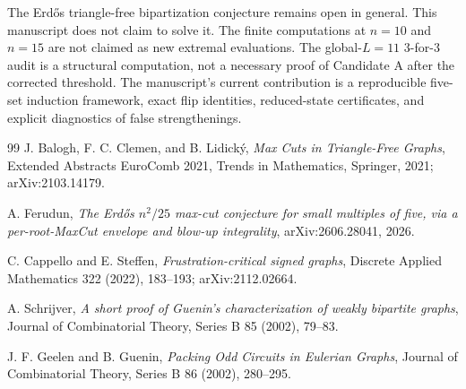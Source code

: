 \documentclass[11pt]{article}
\begin{document}
The Erd\H{o}s triangle-free bipartization conjecture remains open in
general.  This manuscript does not claim to solve it.  The finite
computations at $n=10$ and $n=15$ are not claimed as new extremal
evaluations.  The global-$L=11$ 3-for-3 audit is a structural computation,
not a necessary proof of Candidate A after the corrected threshold.
The manuscript's current contribution is a reproducible five-set induction
framework, exact flip identities, reduced-state certificates, and explicit
diagnostics of false strengthenings.

\begin{thebibliography}{99}
J. Balogh, F. C. Clemen, and B. Lidick\'y,
\emph{Max Cuts in Triangle-Free Graphs},
Extended Abstracts EuroComb 2021, Trends in Mathematics, Springer, 2021;
arXiv:2103.14179.

A. Ferudun,
\emph{The Erd\H{o}s $n^2/25$ max-cut conjecture for small multiples of five,
via a per-root-MaxCut envelope and blow-up integrality},
arXiv:2606.28041, 2026.

C. Cappello and E. Steffen,
\emph{Frustration-critical signed graphs},
Discrete Applied Mathematics 322 (2022), 183--193;
arXiv:2112.02664.

A. Schrijver,
\emph{A short proof of Guenin's characterization of weakly bipartite graphs},
Journal of Combinatorial Theory, Series B 85 (2002), 79--83.

J. F. Geelen and B. Guenin,
\emph{Packing Odd Circuits in Eulerian Graphs},
Journal of Combinatorial Theory, Series B 86 (2002), 280--295.
\end{thebibliography}
\end{document}
